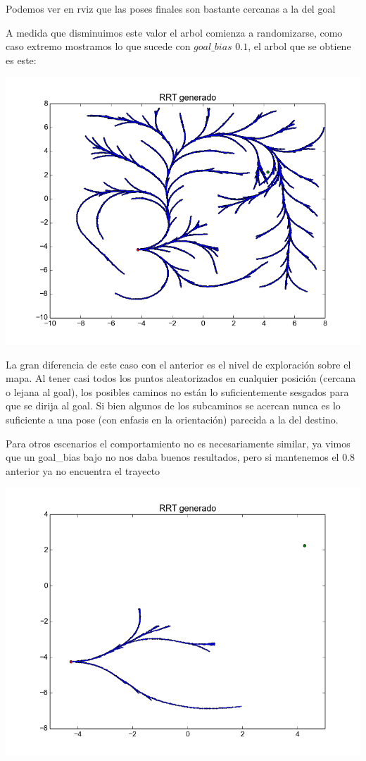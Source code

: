 Podemos ver en rviz que las poses finales son bastante cercanas a la del goal

A medida que disminuimos este valor el arbol comienza a randomizarse, como caso extremo mostramos lo que sucede con $goal\_bias$ $0.1$, el arbol que se obtiene es este:

\includegraphics[scale=0.5]{tp4_imagenes/informe_goal_bias_01.png}

La gran diferencia de este caso con el anterior es el nivel de exploración sobre el mapa. Al tener casi todos los puntos aleatorizados en cualquier posición (cercana o lejana al goal), los posibles caminos no están lo suficientemente sesgados para que se dirija al goal. Si bien algunos de los subcaminos se acercan nunca es lo suficiente a una pose (con enfasis en la orientación) parecida a la del destino.


Para otros escenarios el comportamiento no es necesariamente similar, ya vimos que un goal\_bias bajo no nos daba buenos resultados, pero si mantenemos el $0.8$ anterior ya no encuentra el trayecto

\includegraphics[scale=0.5]{tp4_imagenes/informe_goal_bias_dificil_08.png}

